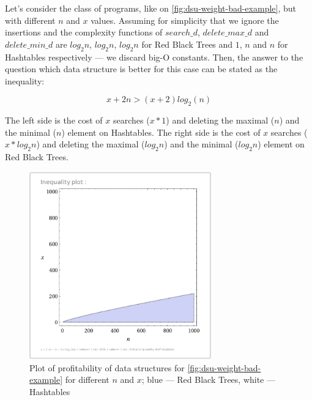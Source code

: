 \documentclass[a4paper,11pt]{article}
\begin{document}
            Let's consider the class of programs, like on \autoref{fig:dsu-weight-bad-example}, but with different $n$
            and $x$ values. Assuming for simplicity that we ignore the insertions and the complexity functions of $search\_d$,
            $delete\_max\_d$ and $delete\_min\_d$ are $log_2 n$, $log_2 n$, $log_2 n$ for Red Black Trees and $1$, $n$ and $n$
            for Hashtables respectively --- we discard big-O constants. Then, the answer to the question which data structure 
            is better for this case can be stated as the inequality:

            \begin{equation}
                x + 2n > (x + 2)log_2(n)
            \end{equation}
            
            The left side is the cost of $x$ searches ($x * 1$) and deleting the maximal ($n$) and the minimal ($n$) element on Hashtables.
            The right side is the cost of $x$ searches ($x * log_2 n$) and deleting the maximal ($log_2 n$) and the minimal ($log_2 n$) element on Red Black Trees.
                \begin{figure}[!h]
                \begin{center}
                    \includegraphics[width=0.7\textwidth]{thesis-pics/dsu-weight-example.png}
                \end{center}

                \caption{Plot of profitability of data structures for \autoref{fig:dsu-weight-bad-example} for different
                $n$ and $x$; blue --- Red Black Trees, white --- Hashtables}

                \label{fig:dsu-weight-bad-plot}
            \end{figure}
\end{document}
